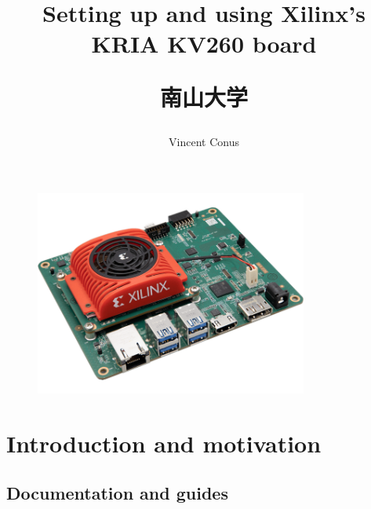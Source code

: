\documentclass[10pt]{article}
\title{Setting up and using Xilinx's KRIA KV260 board \\[1ex] \large \begin{CJK}{UTF8}{min}南山大学\end{CJK}}
\date{}
\author{Vincent Conus}
\begin{document}
\maketitle

\begin{figure}[H]
  \centering
  \includegraphics[width=0.8\textwidth]{./img/board}
\end{figure}

\pagebreak
\tableofcontents

\pagebreak
\section{Introduction and motivation}
\label{sec:intr-motiv}

\subsection{Documentation and guides}
\label{sec:documentation-guides}
\end{document}

